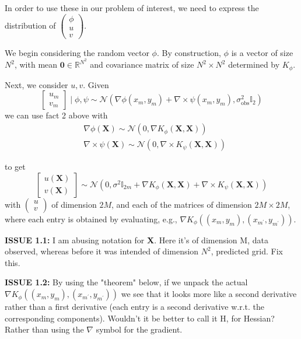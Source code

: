 \documentclass[11pt,a4paper]{article}
\newcommand{\icol}[1]{%
  \left(\begin{smallmatrix}#1\end{smallmatrix}\right)%
}
\begin{document}
In order to use these in our problem of interest, we need to express the distribution of $\icol{\phi \\ u \\ v }$. 

We begin considering the random vector $\phi$. By construction, $\phi$ is a vector of size $N^2$, with mean $\textbf{0} \in \mathbb{R}^{N^2}$ and covariance matrix of size $N^2 \times N^2$ determined by $K_{\phi}$. 

Next, we consider $u, v$. Given 
$$
\begin{bmatrix}
u_m \\ v_m
\end{bmatrix}
\mid \phi, \psi \sim \mathcal{N}\left(\nabla \phi (x_m, y_m) + \nabla \times \psi (x_m , y_m), \sigma^2_{\text{obs}} \mathbb{I}_2\right)
$$
we can use fact 2 above with 
\begin{align*}
   &\nabla \phi (\textbf{X}) \sim \mathcal{N}(0, \nabla K_{\phi}(\textbf{X}, \textbf{X})) \\
   &\nabla \times \psi (\textbf{X}) \sim \mathcal{N}(0, \nabla \times K_{\psi}(\textbf{X}, \textbf{X}))
\end{align*}

to get
$$
\begin{bmatrix}
u(\textbf{X}) \\ v(\textbf{X})
\end{bmatrix}
\sim \mathcal{N}\left(0, \sigma^2 \mathbb{I}_{2m} + \nabla K_{\phi}(\textbf{X}, \textbf{X}) + \nabla \times K_{\psi}(\textbf{X}, \textbf{X}) \right)
$$
with $\icol{u \\ v}$ of dimension $2M$, and each of the matrices of dimension $2M \times 2M$, where each entry is obtained by evaluating, e.g., $\nabla K_{\phi}((x_m, y_m), (x_{m^\prime},y_{m^\prime}))$. \newline

\textbf{ISSUE 1.1:} I am abusing notation for \textbf{X}. Here it's of dimension M, data observed, whereas before it was intended of dimension $N^2$, predicted grid. Fix this. \newline

\textbf{ISSUE 1.2:} By using the "theorem" below, if we unpack the actual $\nabla K_{\phi}((x_m, y_m), (x_{m^\prime},y_{m^\prime}))$ we see that it looks more like a second derivative rather than a first derivative (each entry is a second derivative w.r.t. the corresponding components). Wouldn't it be better to call it H, for Hessian? Rather than using the $\nabla$ symbol for the gradient.  \newline
\end{document}
